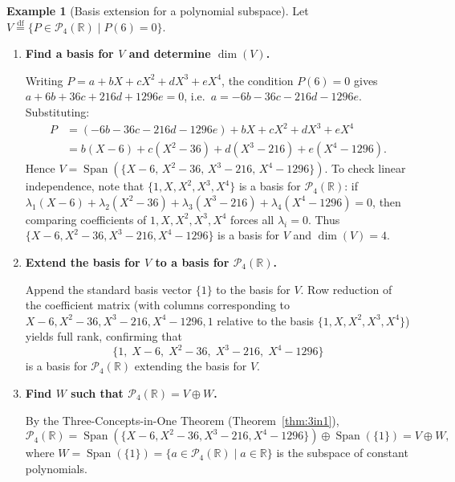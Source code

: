 \documentclass[11pt, a4paper, notitlepage]{report}
\theoremstyle{definition}
\newtheorem{example}[theorem]{Example}
\theoremstyle{remark}
\begin{document}
\begin{example}[Basis extension for a polynomial subspace]\label{ex:dim-poly-subspace}
Let $V \stackrel{\mathrm{df}}{=} \{P\in\mathscr{P}_4(\mathbb{R}) \mid P(6) = 0\}$.
\begin{enumerate}
  \item \textbf{Find a basis for $V$ and determine $\dim(V)$.}

  Writing $P = a + bX + cX^2 + dX^3 + eX^4$, the condition $P(6) = 0$ gives $a + 6b + 36c + 216d + 1296e = 0$, i.e.\ $a = -6b - 36c - 216d - 1296e$. Substituting:
  \begin{align*}
    P &= (-6b-36c-216d-1296e) + bX + cX^2 + dX^3 + eX^4 \\
      &= b(X-6) + c(X^2-36) + d(X^3-216) + e(X^4-1296).
  \end{align*}
  Hence $V = \operatorname{Span}(\{X-6,\, X^2-36,\, X^3-216,\, X^4-1296\})$. To check linear independence, note that $\{1,X,X^2,X^3,X^4\}$ is a basis for $\mathscr{P}_4(\mathbb{R})$: if $\lambda_1(X-6)+\lambda_2(X^2-36)+\lambda_3(X^3-216)+\lambda_4(X^4-1296)=0$, then comparing coefficients of $1,X,X^2,X^3,X^4$ forces all $\lambda_i = 0$. Thus $\{X-6, X^2-36, X^3-216, X^4-1296\}$ is a basis for $V$ and $\dim(V) = 4$.

  \item \textbf{Extend the basis for $V$ to a basis for $\mathscr{P}_4(\mathbb{R})$.}

  Append the standard basis vector $\{1\}$ to the basis for $V$. Row reduction of the coefficient matrix (with columns corresponding to $X-6, X^2-36, X^3-216, X^4-1296, 1$ relative to the basis $\{1,X,X^2,X^3,X^4\}$) yields full rank, confirming that
  \[
    \{1,\; X-6,\; X^2-36,\; X^3-216,\; X^4-1296\}
  \]
  is a basis for $\mathscr{P}_4(\mathbb{R})$ extending the basis for $V$.

  \item \textbf{Find $W$ such that $\mathscr{P}_4(\mathbb{R}) = V\oplus W$.}

  By the Three-Concepts-in-One Theorem (Theorem~\ref{thm:3in1}),
  \[
    \mathscr{P}_4(\mathbb{R}) = \operatorname{Span}(\{X-6, X^2-36, X^3-216, X^4-1296\}) \oplus \operatorname{Span}(\{1\}) = V\oplus W,
  \]
  where $W = \operatorname{Span}(\{1\}) = \{a\in\mathscr{P}_4(\mathbb{R}) \mid a\in\mathbb{R}\}$ is the subspace of constant polynomials.
\end{enumerate}
\end{example}

\end{document}
